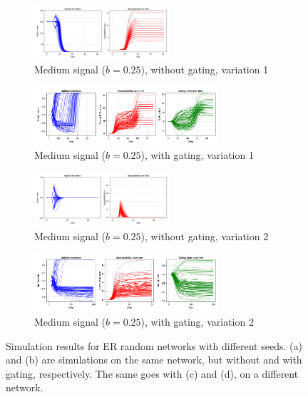 \documentclass[]{article}
\begin{document}
\begin{figure}
	\begin{subfigure}{\linewidth}
		\centering
		\includegraphics[width=0.55\textwidth]{../plots/nvar0_nog_homd_mediumsig_g05_er4_s92391_10000} 
		\caption{Medium signal ($b = 0.25$), without gating, variation 1}  \label{fig:er11}
	\end{subfigure}

	\begin{subfigure}{\linewidth}
		\centering
		\includegraphics[width=0.75\textwidth]{../plots/nvar0_wg_homd_mediumsig_g05_er4_a2_taux5_s92391_10000}
		\caption{Medium signal ($b = 0.25$), with gating, variation 1} \label{fig:er12}
	\end{subfigure}
	
	\begin{subfigure}{\linewidth}
		\centering
		\includegraphics[width=0.55\textwidth]{../plots/nvar0_nog_homd_medsig_g05_er4_s2854} 
		\caption{Medium signal ($b = 0.25$), without gating, variation 2}  \label{fig:er21}
	\end{subfigure}

	\begin{subfigure}{\linewidth}
		\centering
		\includegraphics[width=0.75\textwidth]{../plots/nvar0_wg_homd_mediumsig_g05_er4_a2_taux5_s2854_10000}
		\caption{Medium signal ($b = 0.25$), with gating, variation 2} \label{fig:er22}
	\end{subfigure}
	\caption{Simulation results for ER random networks with different seeds. (a) and (b) are simulations on the same network, but without and with gating, respectively. The same goes with (c) and (d), on a different network.}
	\label{fig:ergraph}
\end{figure}
\end{document}

